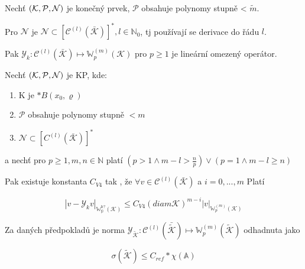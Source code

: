 \documentclass[../main.tex]{subfiles}
\begin{document}
\begin{lemma}[L3]
    Nechť $(\mathcal{K}, \mathcal{P}, \mathcal{N})$ je konečný prvek, $\mathcal{P}$ obsahuje polynomy stupně < $\tilde{m}$.

    Pro $\mathcal{N}$ je $\mathcal{N}\subset \left[ \mathcal{C}^{(l)} (\bar{\mathcal{K}})  \right]^*, l\in \mathbb{N}_0$, tj používají se derivace do řádu $l$.


    Pak $\mathcal{Y}_k : \mathcal{C}^{(l)}(\bar{\mathcal{K}}) \mapsto \mathbb{W}_p^{(m)}(\mathcal{K})$ pro $p\geq1$ je lineární omezený operátor. 
\end{lemma}




\begin{theorem}
    Nechť $(\mathcal{K}, \mathcal{P}, \mathcal{N})$ je KP, kde:
    \begin{enumerate}
        \item K je $*B(x_0,\varrho)$
        \item $\mathcal{P}$ obsahuje polynomy stupně $< m$
        \item $\mathcal{N} \subset \left[C^{(l)}(\bar{\mathcal{K}})\right]^*$   
    \end{enumerate}

    a nechť pro $p\geq 1, m,n\in \mathbb{N}$ platí $(p>1 \wedge m-l > \frac{n}{p}) \vee (p=1 \wedge m-l \geq n)$

    Pak existuje konstanta $C_{V4}$ tak , že $\forall v \in \mathcal{C}^{(l)} (\bar{\mathcal{K}})$ a $i=0,...,m$ Platí


    \begin{equation*}
        |v - \mathcal{Y}_k v|_{\mathbb{W_p^{k ?}}(\mathcal{K})} \leq C_{V4} (diam \mathcal{K})^{m-i} |v|_{\mathbb{W}_p^{(m)} (\mathcal{K})}
    \end{equation*} 

\end{theorem}


\begin{claim}
    Za daných předpokladů  je norma $\mathcal{Y}_{\tilde{\mathcal{K}}} : \mathcal{C}^{(l)}(\bar{\tilde{\mathcal{K}}}) \mapsto \mathbb{W}_p^{(m)}(\tilde{\mathcal{K}})$ odhadnuta jako

    \begin{equation*}
        \sigma(\tilde{\mathcal{K}}) \leq C_{ref} * \chi(\mathbb{A})
    \end{equation*}
\end{claim}
\end{document}
